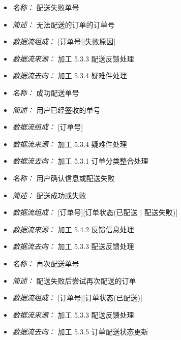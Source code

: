 \vspace{-1mm}


\begin{itemize}
\item \textit{名称： }配送失败单号 
\item \textit{简述： }无法配送的订单的订单号 
\item \textit{数据流组成： }[订单号][失败原因] 
\item \textit{数据流来源： }加工 5.3.3 配送反馈处理 
\item \textit{数据流去向： }加工 5.3.4 疑难件处理

\end{itemize}


\vspace{-1mm}


\begin{itemize}
\item \textit{名称： }成功配送单号
\item \textit{简述： }用户已经签收的单号
\item \textit{数据流组成： }[订单号]
\item \textit{数据流来源： }加工 5.3.4 疑难件处理 
\item \textit{数据流去向： }加工 5.3.1 订单分类整合处理

\end{itemize}


\vspace{-1mm}


\begin{itemize}
\item \textit{名称： }用户确认信息或配送失败
\item \textit{简述： }配送成功或失败 
\item \textit{数据流组成： }[订单号][订单状态(已配送 | 配送失败)] 
\item \textit{数据流来源： }加工 5.4.2 反馈信息处理 
\item \textit{数据流去向： }加工 5.3.3 配送反馈处理

\end{itemize}


\vspace{-1mm}


\begin{itemize}
\item \textit{名称： }再次配送单号 
\item \textit{简述： }配送失败后尝试再次配送的订单 
\item \textit{数据流组成： }[订单号][订单状态(已配送)] 
\item \textit{数据流来源： }加工 5.3.3 配送反馈处理 
\item \textit{数据流去向： }加工 5.3.5 订单配送状态更新

\end{itemize}


